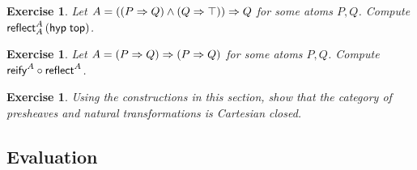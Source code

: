 \documentclass[a4paper]{article}
\newtheorem{exercise}[theorem]{Exercise}
\begin{document}
\begin{exercise}
  Let $A = ((P \imp Q) \land (Q \imp \top)) \imp Q$ for some atoms
  $P,Q$.  Compute $\reflect[A]A{(\hyp \ttop)}$.
\end{exercise}

\begin{exercise}
  Let $A = (P \imp Q) \imp (P \imp Q)$ for some atoms $P,Q$.
  Compute $\treify^A \comp \treflect^A$.
\end{exercise}

\begin{exercise}
  Using the constructions in this section, show that the category of
  presheaves and natural transformations is Cartesian closed.
\end{exercise}


\subsection{Evaluation}
\end{document}
